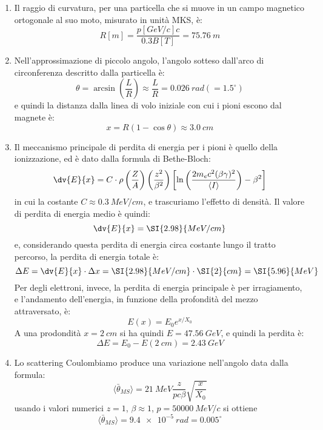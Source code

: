 \begin{Answer}
  \begin{enumerate}
  \item Il raggio di curvatura, per una particella che si muove in un campo magnetico ortogonale al suo moto, misurato in unit\`a MKS, \`e:
    \[
    R [m] = \frac{p[GeV/c] c}{0.3 B[T]} = \SI{75.76}{m}
    \]

  \item Nell'approssimazione di piccolo angolo, l'angolo sotteso
    dall'arco di circonferenza descritto dalla particella \`e:
    \[
    \theta = \arcsin\left(\frac{L}{R}\right) \approx \frac{L}{R} = \SI{0.026}{rad} (=1.5^\circ)
    \]
    e quindi la distanza dalla linea di volo iniziale con cui i pioni escono dal magnete \`e:
    \[
    x = R(1-\cos\theta) \approx \SI{3.0}{cm}
    \]

  \item Il meccanismo principale di perdita di energia per i pioni \`e quello della ionizzazione, ed \`e dato dalla
    formula di Bethe-Bloch:
    \[
    \dv{E}{x} = C \cdot \rho \left(\frac{Z}{A}\right) \left( \frac{z^2}{\beta^2} \right)
    \left[\ln\left(\frac{2m_e c^2(\beta\gamma)^2}{\langle I \rangle}\right) -\beta^2 \right]
    \]
    in cui la costante $C \approx \SI{0.3}{MeV/cm}$, e trascuriamo l'effetto di densit\`a.
    Il valore di perdita di energia medio \`e quindi:
    \[
    \dv{E}{x} = \SI{2.98}{MeV/cm}
    \]
    e, considerando questa perdita di energia circa costante lungo il tratto percorso, la perdita di energia totale \`e:
    \[
    \Delta E = \dv{E}{x} \cdot \Delta x =  \SI{2.98}{MeV/cm} \cdot \SI{2}{cm} = \SI{5.96}{MeV}
    \]
    Per degli elettroni, invece, la perdita di energia principale \`e per irragiamento, e l'andamento
    dell'energia, in funzione della profondit\`a del mezzo attraversato, \`e:
    \[
    E(x) = E_0 e^{x/X_0}
    \]
    A una prodondit\`a $x=\SI{2}{cm}$ si ha quindi $E=\SI{47.56}{GeV}$, e quindi la perdita \`e:
    \[
    \Delta E = E_0 - E(\SI{2}{cm}) = \SI{2.43}{GeV}
    \]

  \item Lo scattering Coulombiamo produce una variazione nell’angolo data dalla formula:
    \[
    \langle \bar \theta_{MS} \rangle = \SI{21}{MeV} \frac{z}{pc\beta}\sqrt{\frac{x}{X_0}}
    \]
    usando i valori numerici $z=1$, $\beta\approx 1$, $p=\SI{50000}{MeV/c}$ si ottiene
    \[
    \langle \bar \theta_{MS} \rangle = \SI{9.4e-5}{rad} = 0.005^\circ
    \]
   \end{enumerate}
\end{Answer}


